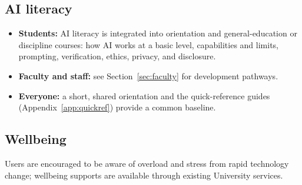 \subsection{AI literacy}
\begin{itemize}
  \item \textbf{Students:} AI literacy is integrated into orientation and general-education or discipline courses: how AI works at a basic level, capabilities and limits, prompting, verification, ethics, privacy, and disclosure.
  \item \textbf{Faculty and staff:} see Section~\ref{sec:faculty} for development pathways.
  \item \textbf{Everyone:} a short, shared orientation and the quick-reference guides (Appendix~\ref{app:quickref}) provide a common baseline.
\end{itemize}

\subsection{Wellbeing}
Users are encouraged to be aware of overload and stress from rapid technology change; wellbeing supports are available through existing University services.
